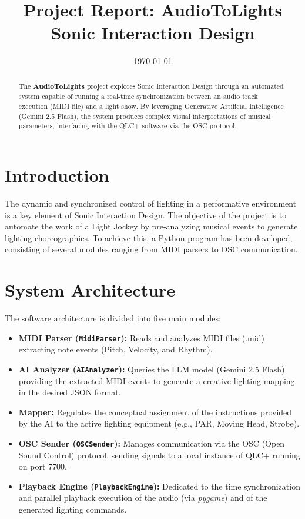 \documentclass[12pt,a4paper]{article}
\title{Project Report: AudioToLights\\ \large Sonic Interaction Design}
\author{}
\date{\today}
\begin{document}
\maketitle

\begin{abstract}
The \textbf{AudioToLights} project explores Sonic Interaction Design through an automated system capable of running a real-time synchronization between an audio track execution (MIDI file) and a light show. By leveraging Generative Artificial Intelligence (Gemini 2.5 Flash), the system produces complex visual interpretations of musical parameters, interfacing with the QLC+ software via the OSC protocol.
\end{abstract}

\section{Introduction}
The dynamic and synchronized control of lighting in a performative environment is a key element of Sonic Interaction Design. The objective of the project is to automate the work of a Light Jockey by pre-analyzing musical events to generate lighting choreographies. To achieve this, a Python program has been developed, consisting of several modules ranging from MIDI parsers to OSC communication.

\section{System Architecture}
The software architecture is divided into five main modules:
\begin{itemize}
    \item \textbf{MIDI Parser (\texttt{MidiParser}):} Reads and analyzes MIDI files (.mid) extracting note events (Pitch, Velocity, and Rhythm).
    \item \textbf{AI Analyzer (\texttt{AIAnalyzer}):} Queries the LLM model (Gemini 2.5 Flash) providing the extracted MIDI events to generate a creative lighting mapping in the desired JSON format.
    \item \textbf{Mapper:} Regulates the conceptual assignment of the instructions provided by the AI to the active lighting equipment (e.g., PAR, Moving Head, Strobe).
    \item \textbf{OSC Sender (\texttt{OSCSender}):} Manages communication via the OSC (Open Sound Control) protocol, sending signals to a local instance of QLC+ running on port 7700.
    \item \textbf{Playback Engine (\texttt{PlaybackEngine}):} Dedicated to the time synchronization and parallel playback execution of the audio (via \textit{pygame}) and of the generated lighting commands.
\end{itemize}
\end{document}
